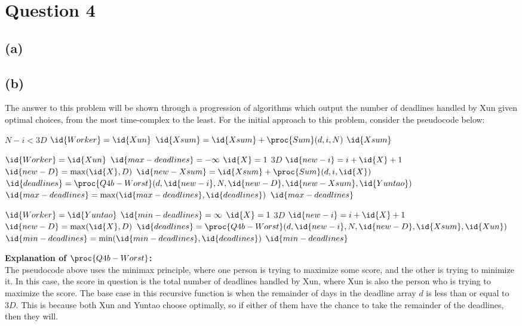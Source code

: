 \section{Question 4}
\subsection{(a)}
\subsection{(b)}
The answer to this problem will be shown through a progression of algorithms which output the number of deadlines handled by Xun given optimal choices, from the most time-complex to the least.
For the initial approach to this problem, consider the pseudocode below:
\begin{spacing}{1.2}
    \begin{codebox}
        \li \If $N - i < 3D$
        \Then
        \li \If $\id{Worker} = \id{Xun}$
        \Then
        \li $\id{Xsum} = \id{Xsum} + \proc{Sum}(d, i, N)$
        \End
        \li \Return $\id{Xsum}$
        \End

        \li \If $\id{Worker} = \id{Xun}$
        \Then
        \li $\id{max-deadlines} = -\infty$
        \li \For $\id{X} = 1$ \To $3D$
        \Do
        \li $\id{new-i} = i + \id{X} + 1$
        \li $\id{new-D} = \max(\id{X}, D)$
        \li $\id{new-Xsum} = \id{Xsum} + \proc{Sum}(d, i, \id{X})$
        \li $\id{deadlines} = \proc{Q4b-Worst}(d, \id{new-i}, N, \id{new-D}, \id{new-Xsum}, \id{Yuntao})$
        \li $\id{max-deadlines} = \max(\id{max-deadlines}, \id{deadlines})$
        \End
        \li \Return $\id{max-deadlines}$
        \End

        \li \If $\id{Worker} = \id{Yuntao}$
        \Then
        \li $\id{min-deadlines} = \infty$
        \li \For $\id{X} = 1$ \To $3D$
        \Do
        \li $\id{new-i} = i + \id{X} + 1$
        \li $\id{new-D} = \max(\id{X}, D)$
        \li $\id{deadlines} = \proc{Q4b-Worst}(d, \id{new-i}, N,\id{new-D}, \id{Xsum}, \id{Xun})$
        \li $\id{min-deadlines} = \min(\id{min-deadlines}, \id{deadlines})$
        \End
        \li \Return $\id{min-deadlines}$
        \End
    \end{codebox}
\end{spacing}
\vspace{7mm}
\textbf{Explanation of $\proc{Q4b-Worst}$:}\\
The pseudocode above uses the minimax principle, where one person is trying to maximize some score, and the other is trying to minimize it.
In this case, the score in question is the total number of deadlines handled by Xun, where Xun is also the person who is trying to maximize the score.
The base case in this recursive function is when the remainder of days in the deadline array $d$ is less than or equal to $3D$.
This is because both Xun and Yuntao choose optimally, so if either of them have the chance to take the remainder of the deadlines, then they will.

